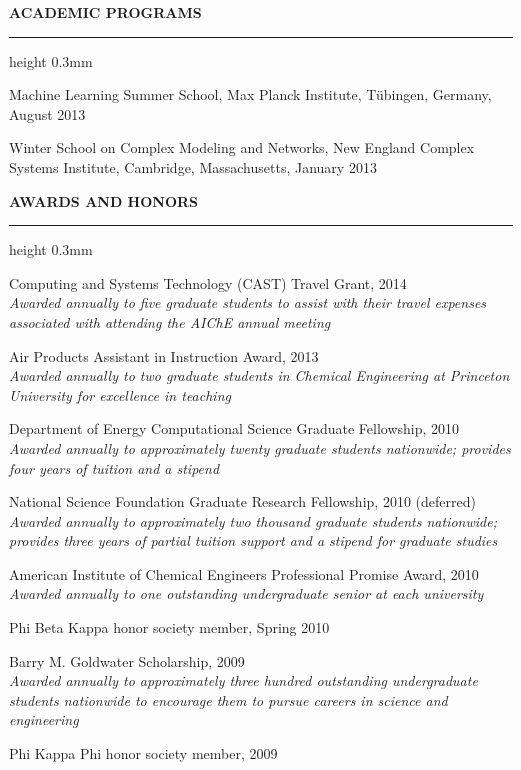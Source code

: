 \documentclass[letterpaper,10pt]{article}
\newenvironment{itemize*}
  {\begin{itemize}
    \setlength{\parskip}{-2pt}}
  {\end{itemize}}
\newcommand{\cvheading}[1]{
\vspace{0.11in}
\noindent
\MakeUppercase{\bf #1}
\vspace{0.06in}
{\hrule height 0.3mm}
\vspace{0.06in}}
\begin{document}
\cvheading{Academic Programs}
\begin{itemize*}
\item Machine Learning Summer School, Max Planck Institute, T\"{u}bingen, Germany, August 2013
\item Winter School on Complex Modeling and Networks, New England Complex Systems Institute, Cambridge, Massachusetts, January 2013
\end{itemize*}



\cvheading{Awards and Honors}
\noindent
\begin{itemize*}
\item Computing and Systems Technology (CAST) Travel Grant, 2014\\
    {\em \small Awarded annually to five graduate students to assist with their travel expenses associated with attending the AIChE annual meeting}
\item Air Products Assistant in Instruction Award, 2013\\
    {\em \small Awarded annually to two graduate students in Chemical Engineering at Princeton University for excellence in teaching}
\item Department of Energy Computational Science Graduate Fellowship, 2010 \\
    {\em \small Awarded annually to approximately twenty graduate students nationwide; provides four years of tuition and a stipend}
\item National Science Foundation Graduate Research Fellowship, 2010 (deferred)\\
    {\em \small Awarded annually to approximately two thousand graduate students nationwide; provides three years of partial tuition support and a stipend for graduate studies}
\item American Institute of Chemical Engineers Professional Promise Award, 2010\\
    {\em \small Awarded annually to one outstanding undergraduate senior at each university}
\item Phi Beta Kappa honor society member, Spring 2010
\item Barry M. Goldwater Scholarship, 2009\\
    {\em \small Awarded annually to approximately three hundred outstanding undergraduate students nationwide to encourage them to pursue careers in science and engineering}
\item Phi Kappa Phi honor society member, 2009
\end{itemize*}
\end{document}
